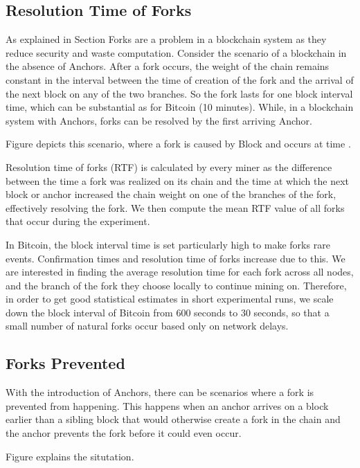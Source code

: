 
\subsection{Resolution Time of Forks} \label{exp-fork}

As explained in Section  Forks are a problem in a blockchain system as they reduce security and waste computation. 
Consider the scenario of a blockchain in the absence of Anchors. After a fork occurs, the weight of the chain remains constant in the interval between the time of creation of the fork and the arrival of the next block on any of the two branches. So the fork lasts for one block interval time, which can be substantial as for Bitcoin (10 minutes). While, in a blockchain system with Anchors, forks can be resolved by the first arriving Anchor. 

Figure  depicts this scenario, where a fork is caused by Block  and occurs at time . 

Resolution time of forks (RTF) is calculated by every miner as the difference between the time a fork was realized on its chain and the time at which the next block or anchor increased the chain weight on one of the branches of the fork, effectively resolving the fork. We then compute the mean RTF value of all forks that occur during the experiment.

In Bitcoin, the block interval time is set particularly high to make forks rare events. Confirmation times and resolution time of forks increase due to this. 
We are interested in finding the average resolution time for each fork across all nodes, and the branch of the fork they choose locally to continue mining on. 
Therefore, in order to get good statistical estimates in short experimental runs, we scale down the block interval of Bitcoin from 600 seconds to 30 seconds, so that a small number of natural forks occur based only on network delays.


\subsection{Forks Prevented} \label{exp-forks-prevented}

With the introduction of Anchors, there can be scenarios where a fork is prevented from happening. This happens when an anchor arrives on a block earlier than a sibling block that would otherwise create a fork in the chain and the anchor prevents the fork before it could even occur.

Figure  explains the situtation. 

